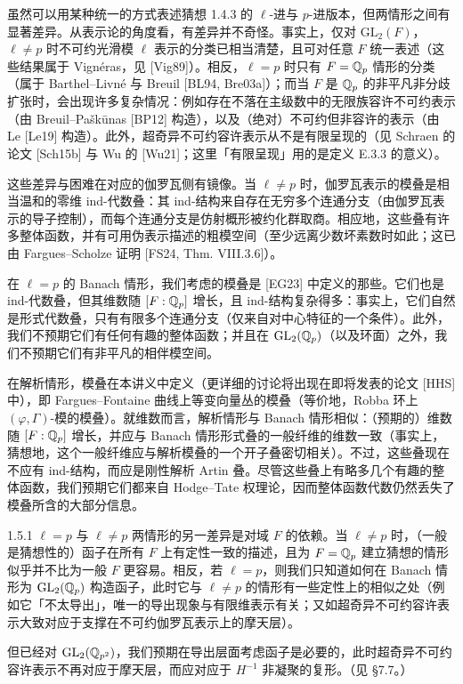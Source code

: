 虽然可以用某种统一的方式表述猜想 1.4.3 的 $\ell$-进与 $p$-进版本，但两情形之间有显著差异。从表示论的角度看，有差异并不奇怪。事实上，仅对 $\mathrm{GL}_2(F)$，$\ell\neq p$ 时不可约光滑模 $\ell$ 表示的分类已相当清楚，且可对任意 $F$ 统一表述（这些结果属于 Vignéras，见 [Vig89]）。相反，$\ell=p$ 时只有 $F=\mathbb{Q}_p$ 情形的分类（属于 Barthel--Livné 与 Breuil [BL94, Bre03a]）；而当 $F$ 是 $\mathbb{Q}_p$ 的非平凡非分歧扩张时，会出现许多复杂情况：例如存在不落在主级数中的无限族容许不可约表示（由 Breuil--Paškūnas [BP12] 构造），以及（绝对）不可约但非容许的表示（由 Le [Le19] 构造）。此外，超奇异不可约容许表示从不是有限呈现的（见 Schraen 的论文 [Sch15b] 与 Wu 的 [Wu21]；这里「有限呈现」用的是定义 E.3.3 的意义）。

这些差异与困难在对应的伽罗瓦侧有镜像。当 $\ell\neq p$ 时，伽罗瓦表示的模叠是相当温和的零维 ind-代数叠：其 ind-结构来自存在无穷多个连通分支（由伽罗瓦表示的导子控制），而每个连通分支是仿射概形被约化群取商。相应地，这些叠有许多整体函数，并有可用伪表示描述的粗模空间（至少远离少数坏素数时如此；这已由 Fargues--Scholze 证明 [FS24, Thm. VIII.3.6]）。

在 $\ell=p$ 的 Banach 情形，我们考虑的模叠是 [EG23] 中定义的那些。它们也是 ind-代数叠，但其维数随 $[F:\mathbb{Q}_p]$ 增长，且 ind-结构复杂得多：事实上，它们自然是形式代数叠，只有有限多个连通分支（仅来自对中心特征的一个条件）。此外，我们不预期它们有任何有趣的整体函数；并且在 $\mathrm{GL}_2(\mathbb{Q}_p)$（以及环面）之外，我们不预期它们有非平凡的相伴模空间。

在解析情形，模叠在本讲义中定义（更详细的讨论将出现在即将发表的论文 [HHS] 中），即 Fargues--Fontaine 曲线上等变向量丛的模叠（等价地，Robba 环上 $(\varphi,\Gamma)$-模的模叠）。就维数而言，解析情形与 Banach 情形相似：（预期的）维数随 $[F:\mathbb{Q}_p]$ 增长，并应与 Banach 情形形式叠的一般纤维的维数一致（事实上，猜想地，这个一般纤维应与解析模叠的一个开子叠密切相关）。不过，这些叠现在不应有 ind-结构，而应是刚性解析 Artin 叠。尽管这些叠上有略多几个有趣的整体函数，我们预期它们都来自 Hodge--Tate 权理论，因而整体函数代数仍然丢失了模叠所含的大部分信息。

\begin{rem}{1.5.1}\label{rem:a4-1-5-1}
$\ell=p$ 与 $\ell\neq p$ 两情形的另一差异是对域 $F$ 的依赖。当 $\ell\neq p$ 时，（一般是猜想性的）函子在所有 $F$ 上有定性一致的描述，且为 $F=\mathbb{Q}_p$ 建立猜想的情形似乎并不比为一般 $F$ 更容易。相反，若 $\ell=p$，则我们只知道如何在 Banach 情形为 $\mathrm{GL}_2(\mathbb{Q}_p)$ 构造函子，此时它与 $\ell\neq p$ 的情形有一些定性上的相似之处（例如它「不太导出」，唯一的导出现象与有限维表示有关；又如超奇异不可约容许表示大致对应于支撑在不可约伽罗瓦表示上的摩天层）。

但已经对 $\mathrm{GL}_2(\mathbb{Q}_{p^2})$，我们预期在导出层面考虑函子是必要的，此时超奇异不可约容许表示不再对应于摩天层，而应对应于 $H^{-1}$ 非凝聚的复形。（见 §7.7。）
\end{rem}

